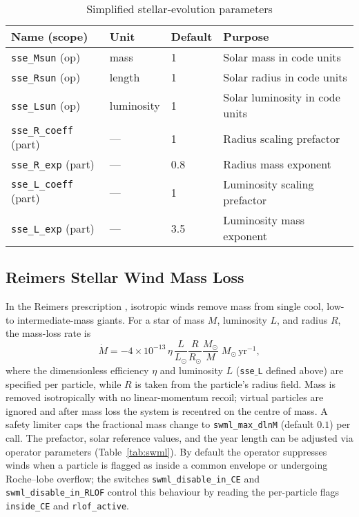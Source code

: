 \documentclass[11pt]{article}
\begin{document}
\begin{table}[h]
\centering\footnotesize
\caption{Simplified stellar-evolution parameters}
\label{tab:sse}
\begin{tabular}{@{}llll@{}}
\toprule
Name (scope) & Unit & Default & Purpose \\
\midrule
\texttt{sse\_Msun}   (op) & mass      & 1   & Solar mass in code units\\
\texttt{sse\_Rsun}   (op) & length     & 1   & Solar radius in code units\\
\texttt{sse\_Lsun}   (op) & luminosity & 1   & Solar luminosity in code units\\
\texttt{sse\_R\_coeff} (part) & —       & 1   & Radius scaling prefactor\\
\texttt{sse\_R\_exp}   (part) & —       & 0.8 & Radius mass exponent\\
\texttt{sse\_L\_coeff} (part) & —       & 1   & Luminosity scaling prefactor\\
\texttt{sse\_L\_exp}   (part) & —       & 3.5 & Luminosity mass exponent\\
\bottomrule
\end{tabular}
\end{table}

\subsection{Reimers Stellar Wind Mass Loss}
\label{sec:swml}
In the Reimers prescription \citep{Reimers1975}, isotropic winds remove mass from single cool, low- to intermediate-mass giants. For a star of mass $M$, luminosity $L$, and radius
$R$, the mass-loss rate is
\[
\dot M = -4\times10^{-13}\,\eta\,\frac{L}{L_\odot}\frac{R}{R_\odot}\frac{M_\odot}{M}
\;M_\odot\,\mathrm{yr}^{-1},
\]
where the dimensionless efficiency $\eta$ and luminosity $L$ (\texttt{sse$\_$L} defined above) are specified per particle, while $R$ is taken from the particle's radius field.
Mass is removed isotropically with no linear-momentum
recoil; virtual particles are ignored and after mass loss the system is
recentred on the centre of mass.  A safety limiter caps the fractional
mass change to \texttt{swml\_max\_dlnM} (default $0.1$) per call.  The
prefactor, solar reference values, and the year length can be adjusted via
operator parameters (Table~\ref{tab:swml}).  By default the operator
suppresses winds when a particle is flagged as inside a common envelope or
undergoing Roche–lobe overflow; the switches
\texttt{swml\_disable\_in\_CE} and \texttt{swml\_disable\_in\_RLOF}
control this behaviour by reading the per-particle flags
\texttt{inside\_CE} and \texttt{rlof\_active}.
\end{document}
